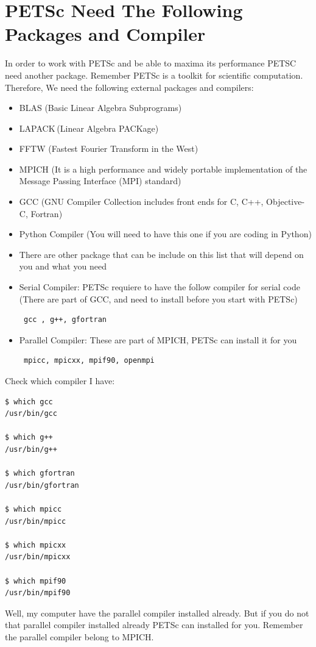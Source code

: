 \documentclass{article}
\begin{document}
\section{PETSc Need The Following Packages and Compiler}
In order to work with PETSc and be able to maxima its performance PETSC need another package. Remember PETSc is a toolkit for scientific computation.
Therefore, We need the following external packages and compilers:
\begin{itemize}
 \item BLAS (Basic Linear Algebra Subprograms)
 \item LAPACK (Linear Algebra PACKage)
 \item FFTW (Fastest Fourier Transform in the West)
 \item MPICH (It is a high performance and widely portable implementation of the Message Passing Interface (MPI) standard)
 \item GCC (GNU Compiler Collection includes front ends for C, C++, Objective-C, Fortran)
 \item Python Compiler (You will need to have this one if you are coding in Python)
 \item There are other package that can be include on this list that will depend on you and what you need
\end{itemize}
\begin{itemize}
 \item Serial Compiler: PETSc requiere to have the follow compiler for serial code (There are part of GCC, and need to install before you start with PETSc)
\begin{verbatim}
 gcc , g++, gfortran
\end{verbatim}
\item Parallel Compiler: These are part of MPICH, PETSc can install it for you
\begin{verbatim}
 mpicc, mpicxx, mpif90, openmpi
\end{verbatim}
\end{itemize}
Check which compiler I have:
\footnotesize
\begin{verbatim}
$ which gcc
/usr/bin/gcc

$ which g++
/usr/bin/g++

$ which gfortran
/usr/bin/gfortran

$ which mpicc
/usr/bin/mpicc

$ which mpicxx
/usr/bin/mpicxx

$ which mpif90
/usr/bin/mpif90
\end{verbatim}
\normalsize
Well, my computer have the parallel compiler installed already. But if you do not that parallel compiler installed already PETSc can installed for you.
Remember the parallel compiler belong to MPICH.
\end{document}
